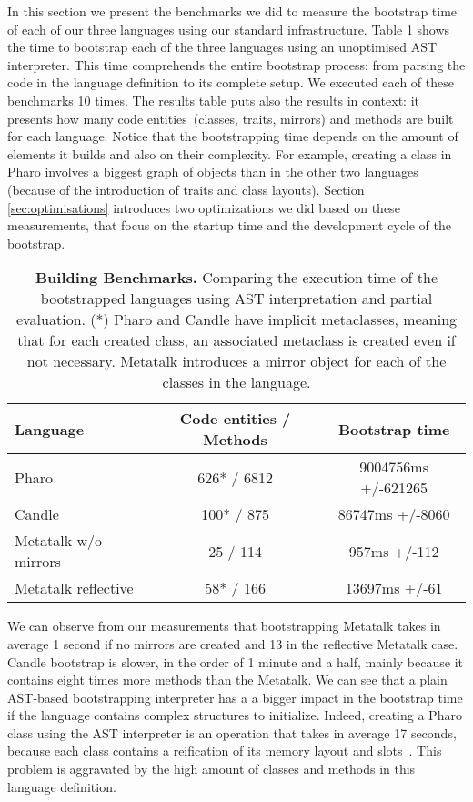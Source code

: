 In this section we present the benchmarks we did to measure the bootstrap time of each of our three languages using our standard infrastructure. Table \ref{tb:measurements} shows the time to bootstrap each of the three languages using an unoptimised AST interpreter. This time comprehends the entire bootstrap process: from parsing the code in the language definition to its complete setup. We executed each of these benchmarks 10 times. The results table puts also the results in context: it presents how many code entities~(classes, traits, mirrors) and methods are built for each language. Notice that the bootstrapping time depends on the amount of elements it builds and also on their complexity. For example, creating a class in Pharo involves a biggest graph of objects than in the other two languages (because of the introduction of traits and class layouts). Section \ref{sec:optimisations} introduces two optimizations we did based on these measurements, that focus on the startup time and the development cycle of the bootstrap. 

 \begin{table}[ht]
 \small
 	\centering
 	\begin{tabular}{|l|c|c|}
			\hline
			\textbf{Language}
			& \xspace\textbf{Code entities / Methods}\xspace
			& \xspace\textbf{Bootstrap time}\\
		\hline
		Pharo & 626* / 6812 & 9004756ms +/-621265 \\\hline
		Candle & 100* / 875 & 86747ms +/-8060 \\\hline
		Metatalk w/o mirrors & 25 / 114 & 957ms +/-112 \\\hline
		Metatalk reflective & 58* / 166 & 13697ms +/-61 \\\hline
 	\end{tabular}
		\vspace*{0.2cm}
 	\caption{\small\textbf{Building Benchmarks.} Comparing the execution time of the bootstrapped languages using AST interpretation and partial evaluation. (*) Pharo and Candle have implicit metaclasses, meaning that for each created class, an associated metaclass is created even if not necessary. Metatalk introduces a mirror object for each of the classes in the language.\label{tb:measurements}}
 \end{table}

We can observe from our measurements that bootstrapping Metatalk takes in average 1 second if no mirrors are created and 13 in the reflective Metatalk case. Candle bootstrap is slower, in the order of 1 minute and a half, mainly because it contains eight times more methods than the Metatalk. We can see that a plain AST-based bootstrapping interpreter has a a bigger impact in the bootstrap time if the language contains complex structures to initialize.  Indeed, creating a Pharo class using the AST interpreter is an operation that takes in average 17 seconds, because each class contains a reification of its memory layout and slots~\cite{Verw11a}. This problem is aggravated by the high amount of classes and methods in this language definition.

